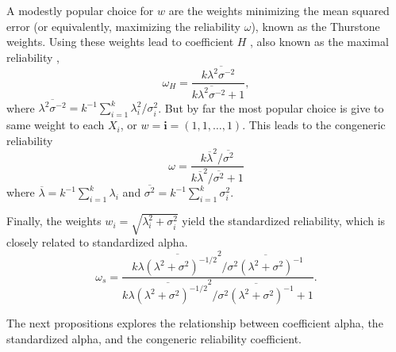 \documentclass{article}
\theoremstyle{plain}
\theoremstyle{plain}
\theoremstyle{definition}
\theoremstyle{remark}
\theoremstyle{definition}
\theoremstyle{plain}
\theoremstyle{plain}
\theoremstyle{definition}
\begin{document}
A modestly popular choice for $w$ are the weights minimizing the mean squared error (or equivalently, maximizing the reliability $\omega$), known as the Thurstone \citep{thurshronebook} weights. Using these weights lead to coefficient $H$ \citep{hancock2001rethinking}, also known as the maximal reliability \citep{Li1997-yh}, 
\begin{equation}
\label{eq:coefficient_H}
\omega_{H}=\frac{k\overline{\lambda^{2}\sigma^{-2}}}{k\overline{\lambda^{2}\sigma^{-2}}+1},
\end{equation}
where $\overline{\lambda^{2}\sigma^{-2}} = k^{-1}\sum_{i=1}^{k}\lambda_{i}^2/\sigma_i^2$. But by far the most popular choice is give to same weight to each $X_i$, or $w = \mathbf{i}=\left(1,1,\ldots,1\right)$. This leads to the congeneric reliability
\begin{equation}
\omega =\frac{k\overline{\lambda}^{2}/\overline{\sigma^{2}}}{k\overline{\lambda}^{2}/\overline{\sigma^{2}} + 1}\label{eq:Congeneric reliability}
\end{equation}
where $\overline{\lambda}=k^{-1}\sum_{i=1}^{k}\lambda_{i}$ and
$\overline{\sigma^{2}}=k^{-1}\sum_{i=1}^{k}\sigma_{i}^{2}$.

Finally, the weights $w_i = \sqrt{\lambda_i^2 + \sigma_i^2}$ yield the standardized reliability, which is closely related to standardized alpha.
\begin{equation}
\omega_s=\frac{k\overline{\lambda(\lambda^{2}+\sigma^{2})^{-1/2}}^{2}/\overline{\sigma^{2}(\lambda^{2}+\sigma^{2})^{-1}}}{k\overline{\lambda(\lambda^{2}+\sigma^{2})^{-1/2}}^{2}/\overline{\sigma^{2}(\lambda^{2}+\sigma^{2})^{-1}}+1}.\label{eq:Standardized reliability}
\end{equation}


The next propositions explores the relationship between coefficient alpha, the standardized alpha, and the congeneric reliability coefficient.
\end{document}
